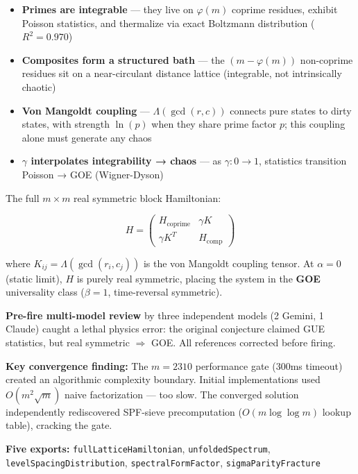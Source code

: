 \documentclass[
  11pt,
]{article}
\providecommand{\tightlist}{%
  \setlength{\itemsep}{0pt}\setlength{\parskip}{0pt}}
\numberwithin{equation}{section}
\begin{document}
\begin{itemize}
\tightlist
\item
  \textbf{Primes are integrable} --- they live on \(\varphi(m)\) coprime
  residues, exhibit Poisson statistics, and thermalize via exact
  Boltzmann distribution (\(R^2 = 0.970\))
\item
  \textbf{Composites form a structured bath} --- the
  \((m - \varphi(m))\) non-coprime residues sit on a near-circulant
  distance lattice (integrable, not intrinsically chaotic)
\item
  \textbf{Von Mangoldt coupling} --- \(\Lambda(\gcd(r,c))\) connects
  pure states to dirty states, with strength \(\ln(p)\) when they share
  prime factor \(p\); this coupling alone must generate any chaos
\item
  \textbf{\(\gamma\) interpolates integrability → chaos} --- as
  \(\gamma: 0 \to 1\), statistics transition Poisson → GOE
  (Wigner-Dyson)
\end{itemize}

The full \(m \times m\) real symmetric block Hamiltonian:

\begin{equation}H = \begin{pmatrix} H_{\text{coprime}} & \gamma K \\ \gamma K^T & H_{\text{comp}} \end{pmatrix}\end{equation}

where \(K_{ij} = \Lambda(\gcd(r_i, c_j))\) is the von Mangoldt coupling
tensor. At \(\alpha = 0\) (static limit), \(H\) is purely real
symmetric, placing the system in the \textbf{GOE} universality class
(\(\beta = 1\), time-reversal symmetric).

\textbf{Pre-fire multi-model review} by three independent models (2
Gemini, 1 Claude) caught a lethal physics error: the original conjecture
claimed GUE statistics, but real symmetric \(\Rightarrow\) GOE. All
references corrected before firing.

\textbf{Key convergence finding:} The \(m = 2310\) performance gate
(300ms timeout) created an algorithmic complexity boundary. Initial
implementations used \(O(m^2\sqrt{m})\) naive factorization --- too
slow. The converged solution independently rediscovered SPF-sieve
precomputation (\(O(m \log \log m)\) lookup table), cracking the gate.

\textbf{Five exports:} \texttt{fullLatticeHamiltonian},
\texttt{unfoldedSpectrum}, \texttt{levelSpacingDistribution},
\texttt{spectralFormFactor}, \texttt{sigmaParityFracture}
\end{document}
